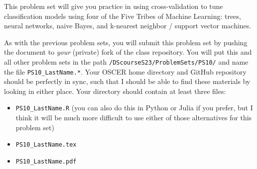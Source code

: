 \documentclass[12pt,english]{exam}
\begin{document}
This problem set will give you practice in using cross-validation to tune classification models using four of the Five Tribes of Machine Learning: trees, neural networks, naive Bayes, and k-nearest neighbor / support vector machines.

As with the previous problem sets, you will submit this problem set by pushing the document to \emph{your} (private) fork of the class repository. You will put this and all other problem sets in the path \texttt{/DScourseS23/ProblemSets/PS10/} and name the file \texttt{PS10\_LastName.*}. Your OSCER home directory and GitHub repository should be perfectly in sync, such that I should be able to find these materials by looking in either place. Your directory should contain at least three files:
\begin{itemize}
    \item \texttt{PS10\_LastName.R} (you can also do this in Python or Julia if you prefer, but I think it will be much more difficult to use either of those alternatives for this problem set)
    \item \texttt{PS10\_LastName.tex}
    \item \texttt{PS10\_LastName.pdf}
\end{itemize}
\end{document}
